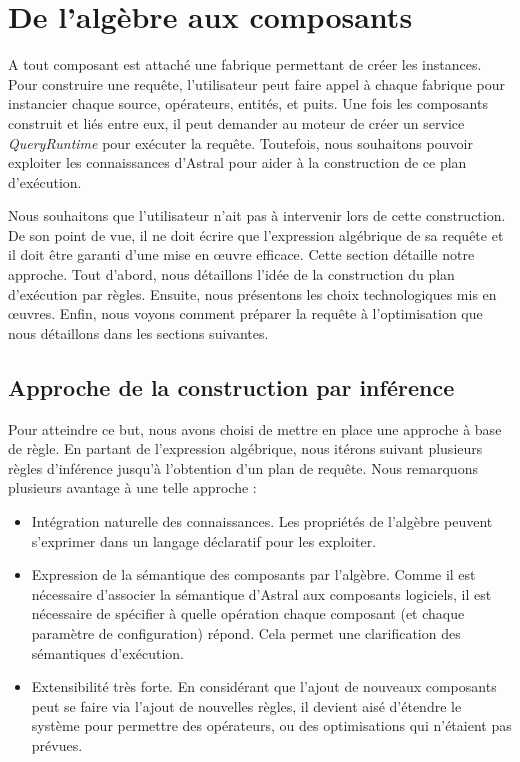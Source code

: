 \section{De l'algèbre aux composants}\label{sec:contrib:astronef:preparation}
A tout composant est attaché une fabrique permettant de créer les instances. Pour construire une requête, l'utilisateur peut faire appel à chaque fabrique pour instancier chaque source, opérateurs, entités, et puits. Une fois les composants construit et liés entre eux, il peut demander au moteur de créer un service \textit{QueryRuntime} pour exécuter la requête. Toutefois, nous souhaitons pouvoir exploiter les connaissances d'Astral pour aider à la construction de ce plan d'exécution.

Nous souhaitons que l'utilisateur n'ait pas à intervenir lors de cette construction. De son point de vue, il ne doit écrire que l'expression algébrique de sa requête et il doit être garanti d'une mise en œuvre efficace. Cette section détaille notre approche. Tout d'abord, nous détaillons l'idée de la construction du plan d'exécution par règles. Ensuite, nous présentons les choix technologiques mis en œuvres. Enfin, nous voyons comment préparer la requête à l'optimisation que nous détaillons dans les sections suivantes.

\subsection{Approche de la construction par inférence}
Pour atteindre ce but, nous avons choisi de mettre en place une approche à base de règle. En partant de l'expression algébrique, nous itérons suivant plusieurs règles d'inférence jusqu'à l'obtention d'un plan de requête. Nous remarquons plusieurs avantage à une telle approche :
\begin{itemize}
	\item Intégration naturelle des connaissances. Les propriétés de l'algèbre peuvent s'exprimer dans un langage déclaratif pour les exploiter.
	\item Expression de la sémantique des composants par l'algèbre. Comme il est nécessaire d'associer la sémantique d'Astral aux composants logiciels, il est nécessaire de spécifier à quelle opération chaque composant (et chaque paramètre de configuration) répond. Cela permet une clarification des sémantiques d'exécution.
	\item Extensibilité très forte. En considérant que l'ajout de nouveaux composants peut se faire via l'ajout de nouvelles règles, il devient aisé d'étendre le système pour permettre des opérateurs, ou des optimisations qui n'étaient pas prévues.
\end{itemize}

